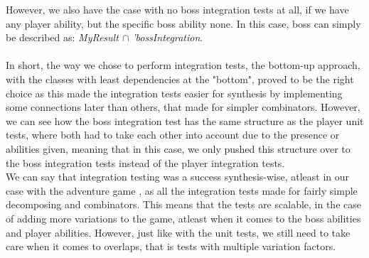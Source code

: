 However, we also have the case with no boss integration tests at all, if we have any player ability, but the specific boss ability none. In this case, boss can simply be described as: \textit{MyResult $\cap$ 'bossIntegration}. \\
\\
In short, the way we chose to perform integration tests, the bottom-up approach, with the classes with least dependencies at the "bottom", proved to be the right choice as this made the integration tests easier for synthesis by implementing some connections later than others, that made for simpler combinators. However, we can see how the boss integration test has the same structure as the player unit tests, where both had to take each other into account due to the presence or abilities given, meaning that in this case, we only pushed this structure over to the boss integration tests instead of the player integration tests. \\
We can say that integration testing was a success synthesis-wise, atleast in our case with the adventure game , as all the integration tests made for fairly simple decomposing and combinators. This means that the tests are scalable, in the case of adding more variations to the game, atleast when it comes to the boss abilities and player abilities. However, just like with the unit tests, we still need to take care when it comes to overlaps, that is tests with multiple variation factors.